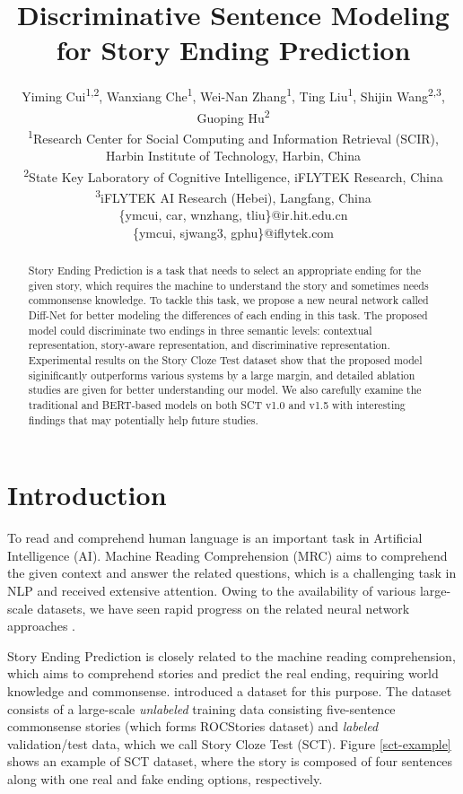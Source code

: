 \documentclass[letterpaper]{article} %
\title{Discriminative Sentence Modeling for Story Ending Prediction }
\author{Yiming Cui\textsuperscript{\rm 1,2}, Wanxiang Che\textsuperscript{\rm 1}, Wei-Nan Zhang\textsuperscript{\rm 1}, Ting Liu\textsuperscript{\rm 1}, Shijin Wang\textsuperscript{\rm 2,3}, Guoping Hu\textsuperscript{\rm 2} \\ %
\textsuperscript{\rm 1}Research Center for Social Computing and Information Retrieval (SCIR), Harbin Institute of Technology, Harbin, China\\ %
\textsuperscript{\rm 2}State Key Laboratory of Cognitive Intelligence, iFLYTEK Research, China\\
\textsuperscript{\rm 3}iFLYTEK AI Research (Hebei), Langfang, China\\
\{ymcui, car, wnzhang, tliu\}@ir.hit.edu.cn \\%
\{ymcui, sjwang3, gphu\}@iflytek.com
}
\begin{document}
\maketitle

\begin{abstract}
Story Ending Prediction is a task that needs to select an appropriate ending for the given story, which requires the machine to understand the story and sometimes needs commonsense knowledge.
To tackle this task, we propose a new neural network called Diff-Net for better modeling the differences of each ending in this task.
The proposed model could discriminate two endings in three semantic levels: contextual representation, story-aware representation, and discriminative representation.
Experimental results on the Story Cloze Test dataset show that the proposed model siginificantly outperforms various systems by a large margin, and detailed ablation studies are given for better understanding our model.
We also carefully examine the traditional and BERT-based models on both SCT v1.0 and v1.5 with interesting findings that may potentially help future studies.
\end{abstract}


\section{Introduction}\label{introduction}
To read and comprehend human language is an important task in Artificial Intelligence (AI).
Machine Reading Comprehension (MRC) aims to comprehend the given context and answer the related questions, which is a challenging task in NLP and received extensive attention.
Owing to the availability of various large-scale datasets, we have seen rapid progress on the related neural network approaches \cite{hermann-etal-2015,kadlec-etal-2016,cui-etal-2016,wang-and-jiang-2016,seo-etal-2016,cui-acl2017-aoa,dhingra-etal-2017}.

Story Ending Prediction is closely related to the machine reading comprehension, which aims to comprehend stories and predict the real ending, requiring world knowledge and commonsense.
\citeauthor{mostafazadeh-etal-2016}  introduced a dataset for this purpose.
The dataset consists of a large-scale {\em unlabeled} training data consisting five-sentence commonsense stories (which forms ROCStories dataset) and {\em labeled} validation/test data, which we call Story Cloze Test (SCT).
Figure \ref{sct-example} shows an example of SCT dataset, where the story is composed of four sentences along with one real and fake ending options, respectively.
\end{document}
